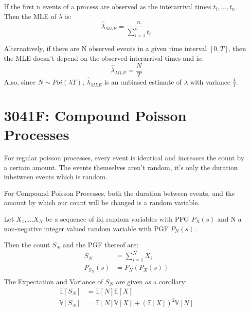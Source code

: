 \documentclass[12pt]{article}
\begin{document}
If the first n events of a process are observed as the interarrival times \(t_i, \dots, t_n\). Then the MLE of \(\lambda\) is:
\begin{equation*}
    \hat{\lambda}_{MLE} = \frac{n}{\sum_{i=1}^{n}t_i}
\end{equation*}


Alternatively, if there are N observed events in a given time interval \([0, T]\), then the MLE doesn't depend on the observed interarrival times and is:
\begin{equation*}
    \hat{\lambda}_{MLE} = \frac{N}{T}
\end{equation*}
Also, since \(N \sim Poi(\lambda T)\), \(\hat{\lambda}_{MLE}\) is an unbiased estimate of 
\(\lambda\) with variance \(\frac{\lambda}{T}\).
\section{3041F: Compound Poisson Processes}
For regular poisson processes, every event is identical and increases the count by a 
certain amount. The events themselves aren't random, it's only the duration inbetween
events which is random.

For Compound Poisson Processes, both the duration between events, and the amount by 
which our count will be changed is a random variable.

Let \(X_1, \dots X_N\) be a sequence of iid random variables with PFG \(P_X(s)\) and N a non-negative integer valued random variable with PGF \(P_N(s)\).

Then the count \(S_N\) and the PGF thereof are:
\begin{equation*}
    \begin{aligned}
        S_N &= \sum_{i=1}^{N} X_i \\
        P_{S_N}(s) &= P_N(P_X(s)) \\
    \end{aligned}
\end{equation*}
The Expectation and Variance of \(S_N\) are given as a corollary:
\begin{equation*}
    \begin{aligned}
        \mathbb{E}[S_N] &= \mathbb{E}[N] \mathbb{E}[X]\\
        \mathbb{V}[S_N] &= \mathbb{E}[N]\mathbb{V}[X] + \left( \mathbb{E}[X]\right)^2 \mathbb{V}[N]\\
    \end{aligned}
\end{equation*}
\end{document}
